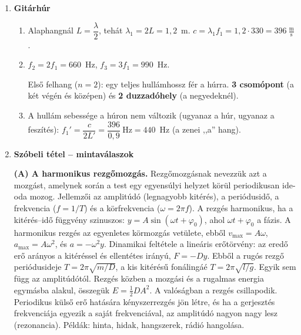 \documentclass[11pt,a4paper]{article}
\begin{document}
\begin{enumerate}
\item \textbf{Gitárhúr}
  \begin{enumerate}
    \item Alaphangnál $L = \dfrac{\lambda}{2}$, tehát $\lambda_1 = 2L = 1{,}2$~m.
      $c = \lambda_1 f_1 = 1{,}2\cdot 330 = 396~\tfrac{\text{m}}{\text{s}}$.
    \item $f_2 = 2f_1 = 660$~Hz, $f_3 = 3f_1 = 990$~Hz.\\[2pt]
      \begin{minipage}[t]{0.5\linewidth}
      Első felhang ($n = 2$): egy teljes hullámhossz fér a húrra. \textbf{3 csomópont} (a két
      végén és középen) és \textbf{2 duzzadóhely} (a negyedeknél).
      \end{minipage}\hfill
      \begin{minipage}[t]{0.45\linewidth}\vspace{0pt}\centering
      \end{minipage}
    \item A hullám sebessége a húron nem változik (ugyanaz a húr, ugyanaz a feszítés):
      $f_1' = \dfrac{c}{2L'} = \dfrac{396}{0{,}9}~\text{Hz} = 440$~Hz (a zenei ,,a'' hang).
  \end{enumerate}

\item \textbf{Szóbeli tétel -- mintaválaszok}

  \textbf{(A) A harmonikus rezgőmozgás.} Rezgőmozgásnak nevezzük azt a mozgást, amelynek
  során a test egy egyensúlyi helyzet körül periodikusan ide-oda mozog. Jellemzői az
  amplitúdó (legnagyobb kitérés), a periódusidő, a frekvencia ($f = 1/T$) és a
  körfrekvencia ($\omega = 2\pi f$). A rezgés harmonikus, ha a kitérés--idő függvény
  szinuszos: $y = A\sin(\omega t + \varphi_0)$, ahol $\omega t + \varphi_0$ a fázis. A
  harmonikus rezgés az egyenletes körmozgás vetülete, ebből
  $v_\text{max} = A\omega$, $a_\text{max} = A\omega^2$, és $a = -\omega^2 y$. Dinamikai
  feltétele a lineáris erőtörvény: az eredő erő arányos a kitéréssel és ellentétes
  irányú, $F = -Dy$. Ebből a rugós rezgő periódusideje $T = 2\pi\sqrt{m/D}$, a kis
  kitérésű fonálingáé $T = 2\pi\sqrt{l/g}$. Egyik sem függ az amplitúdótól. Rezgés közben a
  mozgási és a rugalmas energia egymásba alakul, összegük $E = \tfrac12 DA^2$. A valóságban
  a rezgés csillapodik. Periodikus külső erő hatására kényszerrezgés jön létre, és ha a
  gerjesztés frekvenciája egyezik a saját frekvenciával, az amplitúdó nagyon nagy lesz
  (rezonancia). Példák: hinta, hidak, hangszerek, rádió hangolása.


\end{enumerate}
\end{document}
